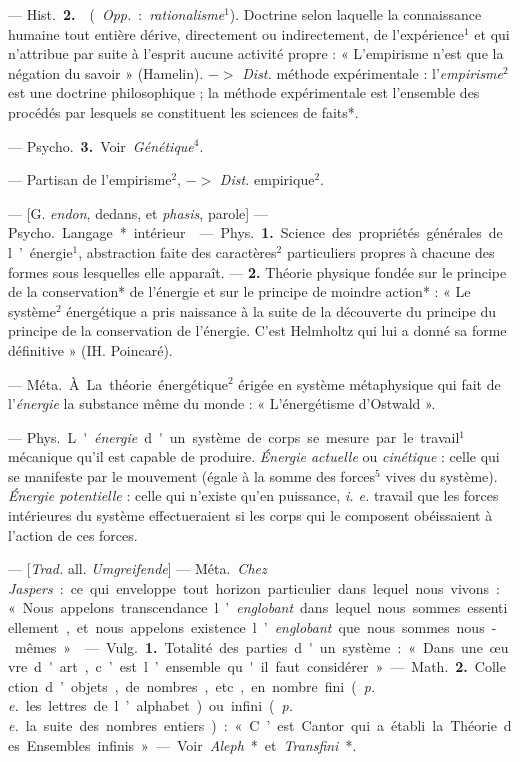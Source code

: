\begin{itemize}[leftmargin=1cm, label=, itemsep=1pt]
— \si{Hist.} {\bf 2.}  ({\it Opp.}: {\it rationalisme}$^1$).
Doctrine selon laquelle la connaissance humaine tout entière dérive,
directement ou indirectement, de
l'expérience$^1$ et qui n’attribue par
suite à l'esprit aucune activité propre : « L’empirisme n’est que la
négation du savoir » (Hamelin).
$->$ {\it Dist.} méthode expérimentale : l'{\it empirisme}$^2$ est
une doctrine philosophique ; la méthode expérimentale est l'ensemble
des procédés par lesquels se constituent les sciences de faits*.

— \si{Psycho.} {\bf 3.} Voir {\it Génétique}$^4$.

 — Partisan de l'empirisme$^2$, $->$ {\it Dist.} empirique$^2$.

 — [G. {\it endon}, dedans, et {\it phasis}, parole]
— \si{Psycho.} Langage* intérieur.

 — \si{Phys.} {\bf 1.} Science des
propriétés générales de l’énergie$^1$,
abstraction faite des caractères$^2$
particuliers propres à chacune des
formes sous lesquelles elle apparaît.
— {\bf 2.} Théorie physique fondée sur
le principe de la conservation* de
l'énergie et sur le principe de moindre
action* : « Le système$^2$ énergétique
a pris naissance à la suite de la
découverte du principe du principe
de la conservation de l'énergie. C’est
Helmholtz qui lui a donné sa forme
définitive » (IH. Poincaré).

 — \si{Méta.} À La théorie
énergétique$^2$ érigée en système métaphysique qui fait de l'{\it énergie}
la substance même du monde : « L’énergétisme d'Ostwald ».

 — \si{Phys.} L'{\it énergie} d'un système de corps se mesure
par le travail$^1$ mécanique qu’il est capable
de produire. {\it Énergie actuelle} ou
{\it cinétique} : celle qui se manifeste par
le mouvement (égale à la somme
des forces$^5$ vives du système).
{\it Énergie potentielle} : celle qui n'existe
qu’en puissance, {\it i. e.} travail que les
forces intérieures du système effectueraient si les corps qui le composent obéissaient à l'action de ces
forces.

 — [{\it Trad.} all. {\it Umgreifende}] —
\si{Méta.} {\it Chez Jaspers} : ce qui enveloppe tout horizon particulier
dans lequel nous vivons : « Nous appelons
transcendance l’{\it englobant} dans lequel
nous sommes essentiellement, et
nous appelons existence l’{\it englobant}
que nous sommes nous-mêmes. »

 — \si{Vulg.} {\bf 1.} Totalité des
parties d'un système : « Dans une
œuvre d'art, c’est l’ensemble qu'il
faut considérer ». — \si{Math.} {\bf 2.} Collection d’objets, de nombres,
etc., en nombre fini ({\it p. e.} les lettres de l’alphabet) ou infini
({\it p. e.} la suite des nombres entiers) : « C’est Cantor qui
a établi la Théorie des Ensembles
infinis ». — Voir {\it Aleph}* et {\it Transfini}*.


\end{itemize}
